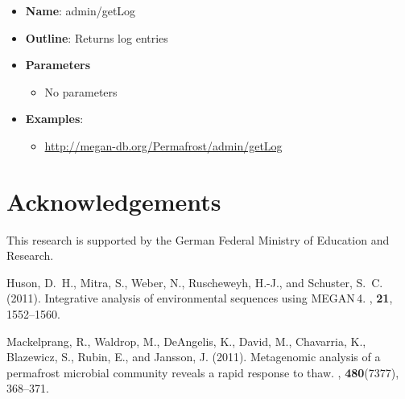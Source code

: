 \documentclass[11pt]{article}
\begin{document}
\begin{itemize}
	\item \textbf{Name}: admin/getLog
	\item \textbf{Outline}: Returns log entries
	\item \textbf{Parameters}
		\begin{itemize}
			\item No parameters
		\end{itemize}
	\item \textbf{Examples}:
		\begin{itemize}
			\item \url{http://megan-db.org/Permafrost/admin/getLog}
		\end{itemize}
\end{itemize}

\section{Acknowledgements}

This research is supported by the German Federal Ministry of Education and Research.


\begin{thebibliography}{}


Huson, D.~H., Mitra, S., Weber, N., Ruscheweyh, H.-J., and Schuster, S.~C.
  (2011).
\newblock Integrative analysis of environmental sequences using {MEGAN\,4}.
, {\bf 21}, 1552--1560.

Mackelprang, R., Waldrop, M., DeAngelis, K., David, M., Chavarria, K.,
  Blazewicz, S., Rubin, E., and Jansson, J. (2011).
\newblock Metagenomic analysis of a permafrost microbial community reveals a
  rapid response to thaw.
, {\bf 480}(7377), 368--371.

\end{thebibliography}
\end{document}
